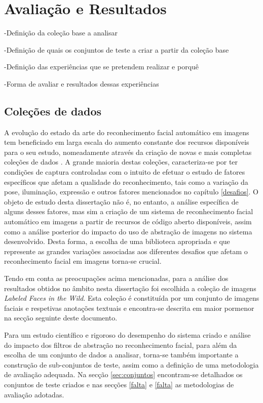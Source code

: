 \chapter{Avaliação e Resultados} \label{chap:resultados}

-Definição da coleção base a analisar

-Definição de quais os conjuntos de teste a criar a partir da coleção base

-Definição das experiências que se pretendem realizar e porquê

-Forma de avaliar e resultados dessas experiências

\section{Coleções de dados} \label{sec:colecoes}

A evolução do estado da arte do reconhecimento facial automático em imagens tem beneficiado em larga escala do aumento constante dos recursos disponíveis para o seu estudo, nomeadamente através da criação de novas e mais completas coleções de dados \cite{Huang2007}. A grande maioria destas coleções, caracteriza-se por ter condições de captura controladas com o intuito de efetuar o estudo de fatores específicos que afetam a qualidade do reconhecimento, tais como a variação da pose, iluminação, expressão e outros fatores mencionados no capítulo \ref{desafios}. O objeto de estudo desta dissertação não é, no entanto, a análise específica de alguns desses fatores, mas sim a criação de um sistema de reconhecimento facial automático em imagens a partir de recursos de código aberto disponíveis, assim como a análise posterior do impacto do uso de abstração de imagens no sistema desenvolvido. Desta forma, a escolha de uma biblioteca apropriada e que represente as grandes variações associadas aos diferentes desafios que afetam o reconhecimento facial em imagens torna-se crucial.

Tendo em conta as preocupações acima mencionadas, para a análise dos resultados obtidos no âmbito nesta dissertação foi escolhida a coleção de imagens \textit{Labeled Faces in the Wild}. Esta coleção é constituída por um conjunto de imagens faciais e respetivas anotações textuais e encontra-se descrita em maior pormenor na secção seguinte deste documento.

Para um estudo científico e rigoroso do desempenho do sistema criado e análise do impacto dos filtros de abstração no reconhecimento facial, para além da escolha de um conjunto de dados a analisar, torna-se também importante a construção de sub-conjuntos de teste, assim como a definição de uma metodologia de avaliação adequada. Na secção \ref{sec:conjuntos} encontram-se detalhados os conjuntos de teste criados e nas secções \ref{falta} e \ref{falta} as metodologias de avaliação adotadas.

